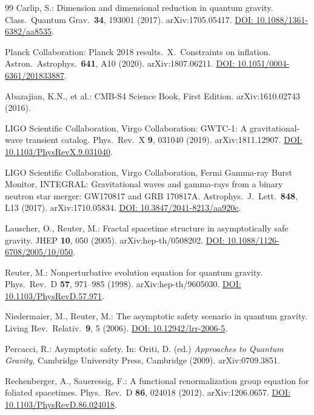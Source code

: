 ﻿\documentclass[12pt,a4paper]{article}
\theoremstyle{definition}
\begin{document}
\begin{thebibliography}{99}
Carlip, S.: Dimension and dimensional reduction in quantum gravity. Class.\ Quantum Grav.\ \textbf{34}, 193001 (2017). arXiv:1705.05417. \href{https://doi.org/10.1088/1361-6382/aa8535}{DOI: 10.1088/1361-6382/aa8535}.

Planck Collaboration: Planck 2018 results.\ X.\ Constraints on inflation. Astron.\ Astrophys.\ \textbf{641}, A10 (2020). arXiv:1807.06211. \href{https://doi.org/10.1051/0004-6361/201833887}{DOI: 10.1051/0004-6361/201833887}.

Abazajian, K.N., et al.: CMB-S4 Science Book, First Edition. arXiv:1610.02743 (2016).

LIGO Scientific Collaboration, Virgo Collaboration: GWTC-1: A gravitational-wave transient catalog. Phys.\ Rev.\ X \textbf{9}, 031040 (2019). arXiv:1811.12907. \href{https://doi.org/10.1103/PhysRevX.9.031040}{DOI: 10.1103/PhysRevX.9.031040}.

LIGO Scientific Collaboration, Virgo Collaboration, Fermi Gamma-ray Burst Monitor, INTEGRAL: Gravitational waves and gamma-rays from a binary neutron star merger: GW170817 and GRB 170817A. Astrophys.\ J.\ Lett.\ \textbf{848}, L13 (2017). arXiv:1710.05834. \href{https://doi.org/10.3847/2041-8213/aa920c}{DOI: 10.3847/2041-8213/aa920c}.

Lauscher, O., Reuter, M.: Fractal spacetime structure in asymptotically safe gravity. JHEP \textbf{10}, 050 (2005). arXiv:hep-th/0508202. \href{https://doi.org/10.1088/1126-6708/2005/10/050}{DOI: 10.1088/1126-6708/2005/10/050}.

Reuter, M.: Nonperturbative evolution equation for quantum gravity. Phys.\ Rev.\ D \textbf{57}, 971--985 (1998). arXiv:hep-th/9605030. \href{https://doi.org/10.1103/PhysRevD.57.971}{DOI: 10.1103/PhysRevD.57.971}.

Niedermaier, M., Reuter, M.: The asymptotic safety scenario in quantum gravity. Living Rev.\ Relativ.\ \textbf{9}, 5 (2006). \href{https://doi.org/10.12942/lrr-2006-5}{DOI: 10.12942/lrr-2006-5}.

Percacci, R.: Asymptotic safety. In: Oriti, D. (ed.) \textit{Approaches to Quantum Gravity}, Cambridge University Press, Cambridge (2009). arXiv:0709.3851.

Rechenberger, A., Saueressig, F.: A functional renormalization group equation for foliated spacetimes. Phys.\ Rev.\ D \textbf{86}, 024018 (2012). arXiv:1206.0657. \href{https://doi.org/10.1103/PhysRevD.86.024018}{DOI: 10.1103/PhysRevD.86.024018}.


\end{thebibliography}
\end{document}
